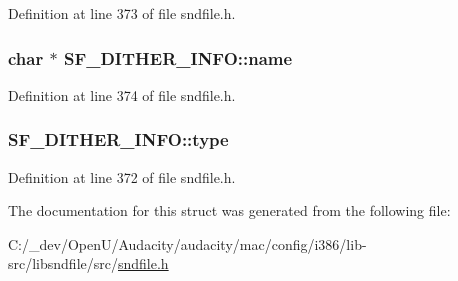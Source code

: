 Definition at line 373 of file sndfile.\+h.

\subsubsection[{\texorpdfstring{name}{name}}]{ char $\ast$ S\+F\+\_\+\+D\+I\+T\+H\+E\+R\+\_\+\+I\+N\+F\+O\+::name}\hypertarget{struct_s_f___d_i_t_h_e_r___i_n_f_o_acf7cbe5faa3a5fe1fdff24ad8feeb995}{}\label{struct_s_f___d_i_t_h_e_r___i_n_f_o_acf7cbe5faa3a5fe1fdff24ad8feeb995}


Definition at line 374 of file sndfile.\+h.

\subsubsection[{\texorpdfstring{type}{type}}]{ S\+F\+\_\+\+D\+I\+T\+H\+E\+R\+\_\+\+I\+N\+F\+O\+::type}\hypertarget{struct_s_f___d_i_t_h_e_r___i_n_f_o_aa2c525816e397993af8b95c0d4c7c69d}{}\label{struct_s_f___d_i_t_h_e_r___i_n_f_o_aa2c525816e397993af8b95c0d4c7c69d}


Definition at line 372 of file sndfile.\+h.



The documentation for this struct was generated from the following file\+:\begin{DoxyCompactItemize}
\item 
C\+:/\+\_\+dev/\+Open\+U/\+Audacity/audacity/mac/config/i386/lib-\/src/libsndfile/src/\hyperlink{mac_2config_2i386_2lib-src_2libsndfile_2src_2sndfile_8h}{sndfile.\+h}\end{DoxyCompactItemize}

